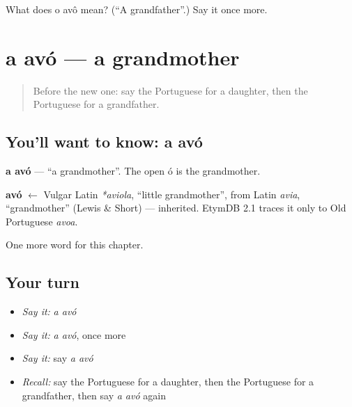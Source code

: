 \begin{tcolorbox}[breakable,colback=teal!4,colframe=teal!35!black,title={Before you move on}]
What does o avô mean? (\textquotedblleft{}A grandfather\textquotedblright{}.) Say it once more.
\end{tcolorbox}
\section[a avó]{a avó — a grandmother}

\label{lesson:PT-C37-avo-f}



\begin{quote}
Before the new one: say the Portuguese for a daughter, then the Portuguese for a grandfather.
\end{quote}

\subsection*{You'll want to know: a avó}
\textbf{a avó} — \textquotedblleft{}a grandmother\textquotedblright{}. The open ó is the grandmother.

\begin{cousinweb}
\textbf{avó} $\leftarrow$ Vulgar Latin \emph{*aviola}, \textquotedblleft{}little grandmother\textquotedblright{}, from Latin \emph{avia}, \textquotedblleft{}grandmother\textquotedblright{} (Lewis \& Short) — inherited. EtymDB 2.1 traces it only to Old Portuguese \emph{avoa}.
\end{cousinweb}

\begin{grammarlens}[title={What you've built}]
One more word for this chapter.
\end{grammarlens}

\subsection*{Your turn}
\begin{itemize}
\raggedright
  \item \emph{Say it:} \emph{a avó}
  \item \emph{Say it:} \emph{a avó}, once more
  \item \emph{Say it:} say \emph{a avó}
  \item \emph{Recall:} say the Portuguese for a daughter, then the Portuguese for a grandfather, then say \emph{a avó} again
\end{itemize}

